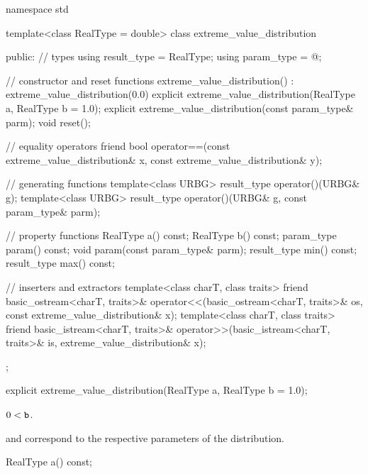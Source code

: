 %
%
\begin{codeblock}
namespace std {
  template<class RealType = double>
  class extreme_value_distribution {
  public:
    // types
    using result_type = RealType;
    using param_type  = @\unspec@;

    // constructor and reset functions
    extreme_value_distribution() : extreme_value_distribution(0.0) {}
    explicit extreme_value_distribution(RealType a, RealType b = 1.0);
    explicit extreme_value_distribution(const param_type& parm);
    void reset();

    // equality operators
    friend bool operator==(const extreme_value_distribution& x,
                           const extreme_value_distribution& y);

    // generating functions
    template<class URBG>
      result_type operator()(URBG& g);
    template<class URBG>
      result_type operator()(URBG& g, const param_type& parm);

    // property functions
    RealType a() const;
    RealType b() const;
    param_type param() const;
    void param(const param_type& parm);
    result_type min() const;
    result_type max() const;

    // inserters and extractors
    template<class charT, class traits>
      friend basic_ostream<charT, traits>&
        operator<<(basic_ostream<charT, traits>& os, const extreme_value_distribution& x);
    template<class charT, class traits>
      friend basic_istream<charT, traits>&
        operator>>(basic_istream<charT, traits>& is, extreme_value_distribution& x);
  };
}
\end{codeblock}


%
\begin{itemdecl}
explicit extreme_value_distribution(RealType a, RealType b = 1.0);
\end{itemdecl}

\begin{itemdescr}
\pnum
\expects
$0 < \texttt{\protect b}$.

\pnum
\remarks
{} and 
correspond to the respective parameters of the distribution.
\end{itemdescr}

%
\begin{itemdecl}
RealType a() const;
\end{itemdecl}

